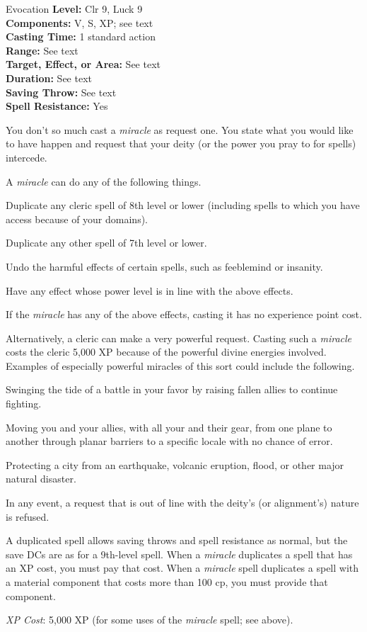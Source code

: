 {Evocation}
{
	\textbf{Level:}
	Clr 9, Luck 9\\
	\textbf{Components:}
	V, S, XP; see text\\
	\textbf{Casting Time:}
	1 standard action\\
	\textbf{Range:}
	See text\\
	\textbf{Target, Effect, or Area:}
	See text\\
	\textbf{Duration:}
	See text\\
	\textbf{Saving Throw:}
	See text\\
	\textbf{Spell Resistance:}
	Yes\\
}
{
	You don't so much cast a \emph{miracle} as request one. You state what you would like to have happen and request that your deity (or the power you pray to for spells) intercede.

	A \emph{miracle} can do any of the following things.

	\begin{itemize*}
	\item Duplicate any cleric spell of 8th level or lower (including spells to which you have access because of your domains).
	\item Duplicate any other spell of 7th level or lower.
	\item Undo the harmful effects of certain spells, such as feeblemind or insanity.
	\item Have any effect whose power level is in line with the above effects.
	\end{itemize*}

	If the \emph{miracle} has any of the above effects, casting it has no experience point cost.

	Alternatively, a cleric can make a very powerful request. Casting such a \emph{miracle} costs the cleric 5,000 XP because of the powerful divine energies involved. Examples of especially powerful miracles of this sort could include the following.

	\begin{itemize*}
	\item Swinging the tide of a battle in your favor by raising fallen allies to continue fighting.
	\item Moving you and your allies, with all your and their gear, from one plane to another through planar barriers to a specific locale with no chance of error.
	\item Protecting a city from an earthquake, volcanic eruption, flood, or other major natural disaster.
	\end{itemize*}

	In any event, a request that is out of line with the deity's (or alignment's) nature is refused.

	A duplicated spell allows saving throws and spell resistance as normal, but the save DCs are as for a 9th-level spell. When a \emph{miracle} duplicates a spell that has an XP cost, you must pay that cost. When a \emph{miracle} spell duplicates a spell with a material component that costs more than 100 cp, you must provide that component.

	\textit{XP Cost}:
	5,000 XP (for some uses of the \emph{miracle} spell; see above).

}
